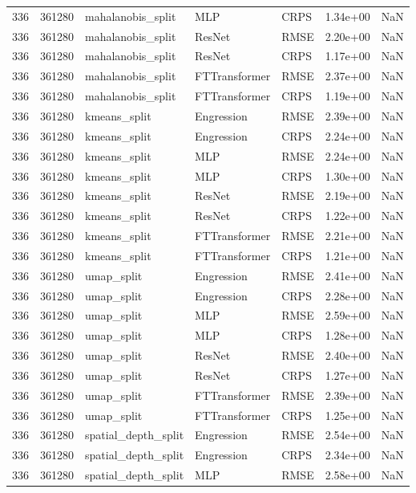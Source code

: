 \begin{tabular}{rrlllrr}
336 & 361280 & mahalanobis\_split & MLP & CRPS & 1.34e+00 & NaN \\
336 & 361280 & mahalanobis\_split & ResNet & RMSE & 2.20e+00 & NaN \\
336 & 361280 & mahalanobis\_split & ResNet & CRPS & 1.17e+00 & NaN \\
336 & 361280 & mahalanobis\_split & FTTransformer & RMSE & 2.37e+00 & NaN \\
336 & 361280 & mahalanobis\_split & FTTransformer & CRPS & 1.19e+00 & NaN \\
336 & 361280 & kmeans\_split & Engression & RMSE & 2.39e+00 & NaN \\
336 & 361280 & kmeans\_split & Engression & CRPS & 2.24e+00 & NaN \\
336 & 361280 & kmeans\_split & MLP & RMSE & 2.24e+00 & NaN \\
336 & 361280 & kmeans\_split & MLP & CRPS & 1.30e+00 & NaN \\
336 & 361280 & kmeans\_split & ResNet & RMSE & 2.19e+00 & NaN \\
336 & 361280 & kmeans\_split & ResNet & CRPS & 1.22e+00 & NaN \\
336 & 361280 & kmeans\_split & FTTransformer & RMSE & 2.21e+00 & NaN \\
336 & 361280 & kmeans\_split & FTTransformer & CRPS & 1.21e+00 & NaN \\
336 & 361280 & umap\_split & Engression & RMSE & 2.41e+00 & NaN \\
336 & 361280 & umap\_split & Engression & CRPS & 2.28e+00 & NaN \\
336 & 361280 & umap\_split & MLP & RMSE & 2.59e+00 & NaN \\
336 & 361280 & umap\_split & MLP & CRPS & 1.28e+00 & NaN \\
336 & 361280 & umap\_split & ResNet & RMSE & 2.40e+00 & NaN \\
336 & 361280 & umap\_split & ResNet & CRPS & 1.27e+00 & NaN \\
336 & 361280 & umap\_split & FTTransformer & RMSE & 2.39e+00 & NaN \\
336 & 361280 & umap\_split & FTTransformer & CRPS & 1.25e+00 & NaN \\
336 & 361280 & spatial\_depth\_split & Engression & RMSE & 2.54e+00 & NaN \\
336 & 361280 & spatial\_depth\_split & Engression & CRPS & 2.34e+00 & NaN \\
336 & 361280 & spatial\_depth\_split & MLP & RMSE & 2.58e+00 & NaN \\

\end{tabular}
